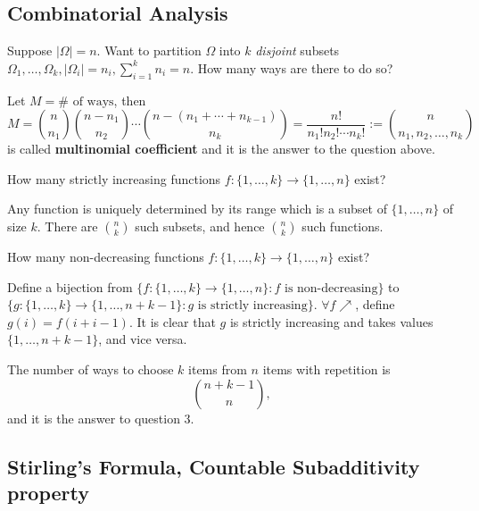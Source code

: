 \subsection{Combinatorial Analysis}

\begin{question}{1}
    Suppose $ |\Omega|=n $. Want to partition $ \Omega $ into $k$ \textit{disjoint} subsets $ \Omega_1,\dots,\Omega_k, |\Omega_i|=n_i, \sum_{i=1}^{k}n_i=n $. How many ways are there to do so?
\end{question}

\begin{definition}
    Let $ M=\# \text{ of ways} $, then 
    \[
        M = \binom{n}{n_1}\binom{n-n_1}{n_2} \cdots \binom{n-(n_1+\cdots+n_{k-1})}{n_k} = \frac{n!}{n_1!n_2!\cdots n_k!} := \binom{n}{n_1,n_2,\dots,n_k}
    \]
    is called \textbf{multinomial coefficient} and it is the answer to the question above.
\end{definition}

\begin{question}{2}
    How many strictly increasing functions $ f: \{1,\dots,k\} \to \{1,\dots,n\}$ exist?
\end{question}

Any function is uniquely determined by its range which is a subset of $ \{1,\dots,n\} $ of size $k$. There are $ \binom{n}{k} $ such subsets, and hence $ \binom{n}{k} $ such functions.

\begin{question}{3}
    How many non-decreasing functions $ f: \{1,\dots,k\} \to \{1,\dots,n\}$ exist?
\end{question}

Define a bijection from $ \{f: \{1,\dots,k\}\to \{1,\dots,n\}: f \text{ is non-decreasing}\} $ to $ \{g: \{1,\dots,k\}\to \{1,\dots,n+k-1\}: g \text{ is strictly increasing}\} $. $ \forall f \nearrow $, define $ g(i)=f(i+i-1) $. It is clear that $g$ is strictly increasing and takes values $ \{1,\dots,n+k-1\} $, and vice versa.
\begin{proposition}\label{prop:Combination with Repetition}
    The number of ways to choose $k$ items from $n$ items with repetition is 
    \[
        \binom{n+k-1}{n},
    \]
    and it is the answer to question 3.
\end{proposition}
\subsection{Stirling's Formula, Countable Subadditivity property}